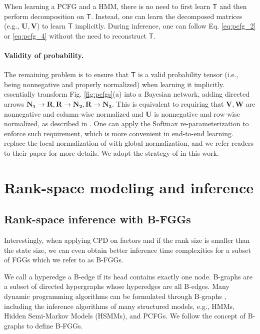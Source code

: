 \documentclass[11pt]{article}
\newcommand{\vect}[1]{\boldsymbol{\mathbf{#1}}}
\newcommand{\rv}[1]{\mathbf{#1}}
\begin{document}
 When learning a PCFG and a HMM, there is no need to first learn $\mathsf{T}$ and then perform decomposition on $\mathsf{T}$. Instead, one can learn the decomposed matrices (e.g., $\vect{U}, \vect{V}$) to learn $\mathsf{T}$ implicitly. During inference, one can follow Eq. \ref{eq:pcfg_2} or \ref{eq:pcfg_4} without the need to reconstruct $\mathsf{T}$.

\paragraph{Validity of probability.}  The remaining problem is to ensure that $\mathsf{T}$ is a valid probability tensor (i.e., being nonnegative and properly normalized) when learning it implicitly.  \citet{yang-etal-2021-pcfgs} essentially transform Fig. \ref{fig:pcfgs}(a) into a Bayesian network, adding directed arrows $\rv{N_1} \rightarrow \rv{R}, \rv{R} \rightarrow \rv{N_2}, \rv{R} \rightarrow \rv{N_3}$. This is equivalent to requiring that $\vect{V}, \vect{W}$ are nonnegative and column-wise normalized and $\vect{U}$ is nonnegative and row-wise normalized, as described in \citet[][]{yang-etal-2021-pcfgs}. One can apply the Softmax re-parameterization to enforce such requirement, which is more convenient in end-to-end learning. \citet{chiu2021low} replace the local normalization of \citet{yang-etal-2021-pcfgs} with global normalization, and we refer readers to their paper for more details. We adopt the strategy of \citet{yang-etal-2021-pcfgs} in this work.






\section{Rank-space modeling and inference}
\subsection{Rank-space inference with B-FGGs}
Interestingly, when applying CPD on factors and if the rank size is smaller than the state size, we can even obtain better inference time complexities for a subset of FGGs which we refer to as B-FGGs. 

We call a hyperedge a B-edge if its head contains exactly one node.
B-graphs \cite{DBLP:journals/dam/GalloLP93} are a subset of directed hypergraphs whose hyperedges are all B-edges. Many dynamic programming algorithms can be formulated through B-graphs \cite{DBLP:conf/iwpt/KleinM01,huang-2008-advanced, DBLP:journals/corr/AzumaSM17, chiu2021low,  fu2021scaling}, including the inference algorithms of many structured models, e.g., HMMs, Hidden Semi-Markov Models (HSMMs), and PCFGs. We follow the concept of B-graphs to define B-FGGs.
\end{document}

